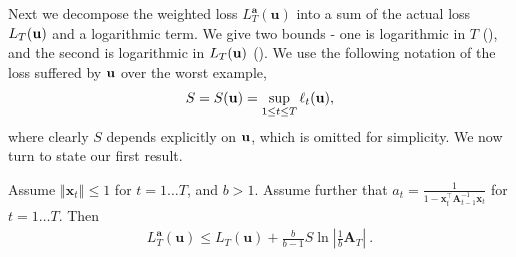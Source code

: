 Next we decompose the weighted loss
$L_{T}^{\boldsymbol{a}}(\mathbf{u})$ into a sum of the actual loss
$L_T(\mathbf{u})$ and a logarithmic term. We give two bounds - one is logarithmic in $T$ (), and the second is logarithmic in $L_T(\mathbf{u})$ ().
We use the following notation of the loss suffered by $\mathbf{u}$ over the
worst example,
\begin{align*}
S=S(\mathbf{u})= \sup_{1\leq t\leq T}\ell_{t}(\mathbf{u}),
\end{align*}
where clearly $S$ depends explicitly on $\mathbf{u}$, which is omitted for
simplicity. We now turn to state our first result.
\begin{theorem}
\label{thm:theorem3}
Assume $\left\Vert \mathbf{x}_{t}\right\Vert \leq1$ for $t=1 \dots T$,
and $b>1$. Assume further that $a_{t}=\frac{1}{1-\mathbf{x}_{t}^{\top}\mathbf{A}_{t-1}^{-1}\mathbf{x}_{t}}$
for $t=1 \dots T$. Then
\begin{align*}
L_{T}^{\boldsymbol{a}}(\mathbf{u})\leq L_{T}(\mathbf{u})+
\frac{b}{b-1}S\ln\left|\frac{1}{b}\mathbf{A}_{T}\right| ~.
\end{align*}
\end{theorem}
